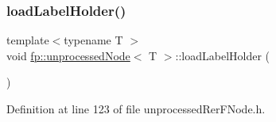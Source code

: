 \subsubsection{\texorpdfstring{load\+Label\+Holder()}{loadLabelHolder()}\hspace{0.1cm}{\footnotesize\ttfamily [2/2]}}
{\footnotesize\ttfamily template$<$typename T $>$ \\
void \hyperlink{classfp_1_1unprocessedNode}{fp\+::unprocessed\+Node}$<$ T $>$\+::load\+Label\+Holder (\begin{DoxyParamCaption}{ }\end{DoxyParamCaption})\hspace{0.3cm}{\ttfamily [inline]}}



Definition at line 123 of file unprocessed\+Rer\+F\+Node.\+h.


